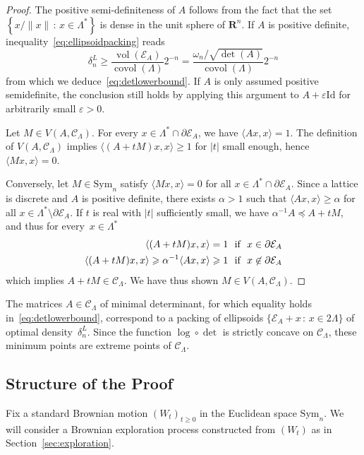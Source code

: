 \documentclass[12pt]{amsart}
\newcommand{\R}{\mathbf{R}}
\newcommand{\e}{\varepsilon}
\newcommand{\Id}{\mathrm{Id}}
\newcommand{\Sym}{\mathrm{Sym}}
\DeclareMathOperator{\vol}{vol}
\DeclareMathOperator{\covol}{covol}
\newcommand{\scalar}[2]{\langle #1 , #2\rangle}
\renewcommand{\geq}{\geqslant}
\theoremstyle{plain}
\theoremstyle{remark}
\begin{document}
\begin{proof}
The positive semi-definiteness of $A$ follows from the fact that the set $\left\{ x/\|x\| \, : \, x \in \Lambda^* \right\}$ is dense in the unit sphere of $\R^n$. If $A$ is positive definite, inequality~\eqref{eq:ellipsoidpacking} reads
\[ \delta_n^L \geq \frac{\vol (\mathcal{E}_A)}{\covol (\Lambda)} 2^{-n} = \frac{\omega_n / \sqrt{\det(A)}}{\covol (\Lambda)} 2^{-n} \]
from which we deduce~\eqref{eq:detlowerbound}. If $A$ is only assumed positive semidefinite, the conclusion still holds by applying this argument to $A + \e \Id$ for arbitrarily small $\e>0$.
 
Let $M \in V(A,\mathscr{C}_\Lambda)$. For every $x \in \Lambda^* \cap \partial\mathcal{E}_A$, we have $\scalar{Ax}{x}=1$. The definition of $V(A,\mathscr{C}_\Lambda)$ implies $\scalar{(A+tM)x}{x} \geq 1$ for $|t|$ small enough, hence $\scalar{Mx}{x}=0$.
 
Conversely, let $M \in \Sym_n$ satisfy $\scalar{Mx}{x} = 0$ for all $x \in \Lambda^* \cap \partial\mathcal{E}_A$. Since a lattice is discrete and $A$ is positive definite, there exists $\alpha >1$ such that $\scalar{Ax}{x} \geq \alpha$ for all $x \in \Lambda^* \setminus \partial\mathcal{E}_A$. If $t$ is real with $|t|$ sufficiently small, we have $\alpha^{-1} A  \preccurlyeq A + t M$, and thus for every~$x \in \Lambda^*$
\begin{align*}
\scalar{(A+tM)x}{x}  = 1 & \ \textnormal{ if }\  x \in \partial\mathcal{E}_A  \\
\scalar{(A+tM)x}{x}  \geq \alpha^{-1} \scalar{Ax}{x} \geq 1 & \ \textnormal{ if } \ x \not \in \partial\mathcal{E}_A
\end{align*}
which implies $A+tM \in \mathscr{C}_\Lambda$. We have thus shown $M \in V(A,\mathscr{C}_\Lambda)$.
\end{proof}
 
The matrices $A \in \mathscr{C}_\Lambda$ of minimal determinant, for which equality holds in~\eqref{eq:detlowerbound}, correspond to a packing of ellipsoids $\{\mathcal{E}_A + x \, : \, x \in 2\Lambda\}$ of optimal density~$\delta_n^L$. Since the function $\log \circ \det$ is strictly concave on $\mathscr{C}_\Lambda$, these minimum points are extreme points of $\mathscr{C}_\Lambda$.
 
\subsection{Structure of the Proof}
 
Fix a standard Brownian motion $(W_t)_{t \geq 0}$ in the Euclidean space $\Sym_n$.
We will consider a Brownian exploration process constructed from $(W_t)$ as in Section~\ref{sec:exploration}.
 
\end{document}
